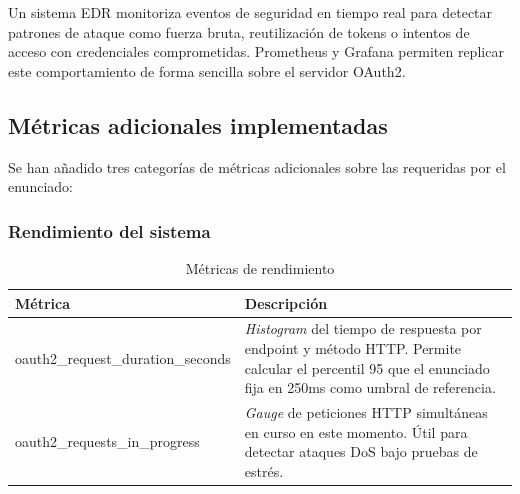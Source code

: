 \documentclass[12pt, a4paper]{article}
\begin{document}
		Un sistema EDR monitoriza eventos de seguridad en tiempo real para detectar
		patrones de ataque como fuerza bruta, reutilización de tokens o intentos de
		acceso con credenciales comprometidas. Prometheus y Grafana permiten replicar
		este comportamiento de forma sencilla sobre el servidor OAuth2.
	
		\subsection{Métricas adicionales implementadas}
		
			Se han añadido tres categorías de métricas adicionales sobre las requeridas
			por el enunciado:
	
		\subsubsection{Rendimiento del sistema}
		
			\begin{table}[H]
				\centering
				\begin{tabular}{>{\ttfamily\small}lp{8cm}}
					\toprule
					\textbf{Métrica} & \textbf{Descripción} \\
					\midrule
					oauth2\_request\_duration\_seconds & \textit{Histogram} del tiempo de respuesta por
					endpoint y método HTTP. Permite calcular el percentil 95 que el enunciado
					fija en 250ms como umbral de referencia. \\
					oauth2\_requests\_in\_progress & \textit{Gauge} de peticiones HTTP simultáneas en
					curso en este momento. Útil para detectar ataques DoS bajo pruebas de estrés. \\
					\bottomrule
				\end{tabular}
				\caption{Métricas de rendimiento}
			\end{table}
	
\end{document}
